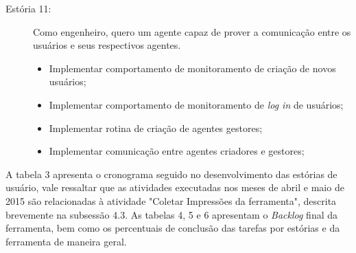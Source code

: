 \begin{description}
\item[Estória 11:]
Como engenheiro, quero um agente capaz de prover a comunicação entre os usuários e seus respectivos agentes.

\begin{itemize}

\item Implementar comportamento de monitoramento de criação de novos usuários;
\item Implementar comportamento de monitoramento de \textit{log in} de usuários;
\item Implementar rotina de criação de agentes gestores;
\item Implementar comunicação entre agentes criadores e gestores;

\end{itemize}

\end{description}

A tabela 3 apresenta o cronograma seguido no desenvolvimento das estórias de usuário, vale ressaltar que as atividades executadas nos meses de abril e maio de 2015 são relacionadas à atividade "Coletar Impressões da ferramenta", descrita brevemente na subsessão 4.3. As tabelas 4, 5 e 6 apresentam  o \textit{Backlog} final da ferramenta, bem como os percentuais de conclusão das tarefas por estórias e da ferramenta de maneira geral.

